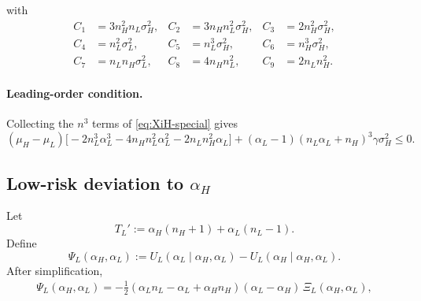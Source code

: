 \documentclass[a4paper,12pt]{article}
\theoremstyle{definition}
\theoremstyle{remark}
\newcommand{\1}{\mathbf{1}}
\begin{document}
with
\begin{align*}
    C_1 &= 3 n_H^2 n_L \sigma_H^2, &
    C_2 &= 3 n_H n_L^2 \sigma_H^2, &
    C_3 &= 2 n_H^2 \sigma_H^2, \\
    C_4 &= n_L^2 \sigma_L^2, &
    C_5 &= n_L^3 \sigma_H^2, &
    C_6 &= n_H^3 \sigma_H^2, \\
    C_7 &= n_L n_H \sigma_L^2, &
    C_8 &= 4 n_H n_L^2, &
    C_9 &= 2 n_L n_H^2.
\end{align*}

\paragraph{Leading-order condition.}
Collecting the $n^3$ terms of \eqref{eq:XiH-special} gives
\begin{equation}\label{eq:IC-H-leading}
    (\mu_H - \mu_L)\Big[-2 n_L^3 \alpha_L^3 - 4 n_H n_L^2 \alpha_L^2 - 2 n_L n_H^2 \alpha_L \Big]
    + (\alpha_L - 1)(n_L \alpha_L + n_H)^3 \gamma \sigma_H^2 \le 0 .
\end{equation}

\subsection{Low-risk deviation to $\alpha_H$}\label{app:IC-L}

Let
\[
    T_L' := \alpha_H(n_H+1) + \alpha_L(n_L-1).
\]
Define
\begin{equation}
    \Psi_L(\alpha_H,\alpha_L)
    := U_L(\alpha_L \mid \alpha_H,\alpha_L)
       - U_L(\alpha_H \mid \alpha_H,\alpha_L).
\end{equation}
After simplification,
\begin{align}
    \Psi_L(\alpha_H,\alpha_L)
    = -\frac{1}{2}
      (\alpha_L n_L - \alpha_L + \alpha_H n_H)
      (\alpha_L - \alpha_H)\,
      \Xi_L(\alpha_H,\alpha_L), \label{eq:PsiL-app}
\end{align}
\end{document}
